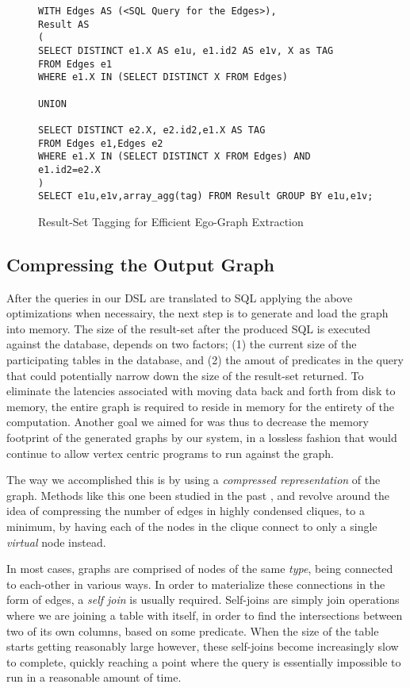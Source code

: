 \documentclass[11pt,letterpaper]{article}
\begin{document}
\begin{figure}[t]
\scriptsize
\begin{lstlisting}[breaklines,basicstyle=\ttfamily]
WITH Edges AS (<SQL Query for the Edges>),
Result AS
(
SELECT DISTINCT e1.X AS e1u, e1.id2 AS e1v, X as TAG
FROM Edges e1
WHERE e1.X IN (SELECT DISTINCT X FROM Edges)

UNION

SELECT DISTINCT e2.X, e2.id2,e1.X AS TAG
FROM Edges e1,Edges e2
WHERE e1.X IN (SELECT DISTINCT X FROM Edges) AND e1.id2=e2.X
)
SELECT e1u,e1v,array_agg(tag) FROM Result GROUP BY e1u,e1v;
\end{lstlisting}
\vspace{-10pt}
\caption{Result-Set Tagging for Efficient Ego-Graph Extraction}
\vspace{-10pt}
\label{fig:tagging}
\end{figure}


\subsection*{Compressing the Output Graph}

After the queries in our DSL are translated to SQL applying the above optimizations when necessairy, the next step is to generate and load the graph into memory. The size of the result-set after the produced SQL is executed against the database, depends on two factors; (1) the current size of the participating tables in the database, and (2) the amout of predicates in the query that could potentially narrow down the size of the result-set returned. To eliminate  the latencies associated with moving data back and forth from disk to memory, the entire graph is required to reside in memory for the entirety of the computation. Another goal we aimed for was thus to decrease the memory footprint of the generated graphs by our system, in a lossless fashion that would continue to allow vertex centric programs to run against the graph.

The way we accomplished this is by using a \textit{compressed representation} of the graph. Methods like this one been studied in the past \cite{feder_1995}, and revolve around the idea of compressing the number of edges in highly condensed cliques, to a minimum, by having each of the nodes in the clique connect to only a single \textit{virtual} node instead.

In most cases, graphs are comprised of nodes of the same \textit{type}, being connected to each-other in various ways. In order to materialize these connections in the form of edges, a \textit{self join} is usually required. Self-joins are simply join operations where we are joining a table with itself, in order to find the intersections between two of its own columns, based on some predicate. When the size of the table starts getting reasonably large however, these self-joins become increasingly slow to complete, quickly reaching a point where the query is essentially impossible to run in a reasonable amount of time.
\end{document}
